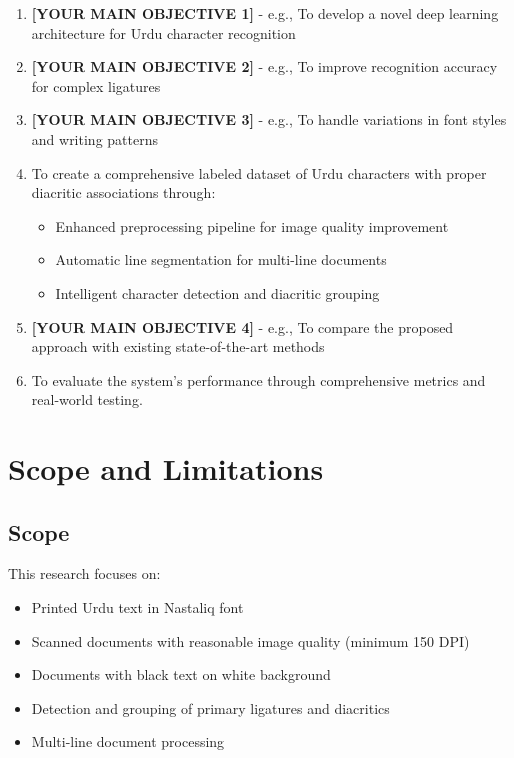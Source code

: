 \documentclass[12pt,a4paper,oneside]{report}
\begin{document}
\begin{enumerate}
    \item \textbf{[YOUR MAIN OBJECTIVE 1]} - e.g., To develop a novel deep learning architecture for Urdu character recognition
    
    \item \textbf{[YOUR MAIN OBJECTIVE 2]} - e.g., To improve recognition accuracy for complex ligatures
    
    \item \textbf{[YOUR MAIN OBJECTIVE 3]} - e.g., To handle variations in font styles and writing patterns
    
    \item To create a comprehensive labeled dataset of Urdu characters with proper diacritic associations through:
    \begin{itemize}
        \item Enhanced preprocessing pipeline for image quality improvement
        \item Automatic line segmentation for multi-line documents
        \item Intelligent character detection and diacritic grouping
    \end{itemize}
    
    \item \textbf{[YOUR MAIN OBJECTIVE 4]} - e.g., To compare the proposed approach with existing state-of-the-art methods
    
    \item To evaluate the system's performance through comprehensive metrics and real-world testing.
\end{enumerate}

\section{Scope and Limitations}

\subsection{Scope}
This research focuses on:
\begin{itemize}
    \item Printed Urdu text in Nastaliq font
    \item Scanned documents with reasonable image quality (minimum 150 DPI)
    \item Documents with black text on white background
    \item Detection and grouping of primary ligatures and diacritics
    \item Multi-line document processing
\end{itemize}
\end{document}
